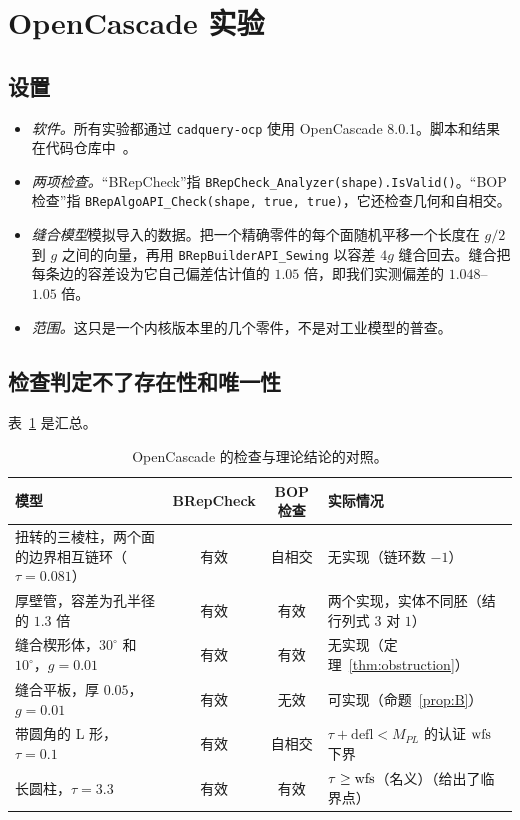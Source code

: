 \section{OpenCascade 实验}\label{sec:experiments}

\subsection{设置}
\begin{itemize}
\item \emph{软件。}所有实验都通过 \texttt{cadquery-ocp} 使用 OpenCascade 8.0.1。脚本和结果在代码仓库中~\cite{repo}。
\item \emph{两项检查。}``BRepCheck''指 \texttt{BRepCheck\_Analyzer(shape).IsValid()}。``BOP 检查''指 \texttt{BRepAlgoAPI\_Check(shape, true, true)}，它还检查几何和自相交。
\item \emph{缝合模型}模拟导入的数据。把一个精确零件的每个面随机平移一个长度在 $g/2$ 到 $g$ 之间的向量，再用 \texttt{BRepBuilderAPI\_Sewing} 以容差 $4g$ 缝合回去。缝合把每条边的容差设为它自己偏差估计值的 $1.05$ 倍，即我们实测偏差的 $1.048$--$1.05$ 倍。
\item \emph{范围。}这只是一个内核版本里的几个零件，不是对工业模型的普查。
\end{itemize}

\subsection{检查判定不了存在性和唯一性}
表~\ref{tab:occ} 是汇总。

\begin{table}[h]
\centering\small
\begin{tabular}{>{\raggedright}p{4.4cm}cc>{\raggedright\arraybackslash}p{5.0cm}}
\toprule
模型 & BRepCheck & BOP 检查 & 实际情况 \\
\midrule
扭转的三棱柱，两个面的边界相互链环（$\tau=0.081$） & 有效 & 自相交 & 无实现（链环数 $-1$） \\
厚壁管，容差为孔半径的 $1.3$ 倍 & 有效 & 有效 & 两个实现，实体不同胚（结行列式 $3$ 对 $1$） \\
缝合楔形体，$30^\circ$ 和 $10^\circ$，$g=0.01$ & 有效 & 有效 & 无实现（定理~\ref{thm:obstruction}） \\
缝合平板，厚 $0.05$，$g=0.01$ & 有效 & 无效 & 可实现（命题~\ref{prop:B}） \\
带圆角的 L 形，$\tau=0.1$ & 有效 & 自相交 & $\tau+\mathrm{defl}<M_{PL}$ 的认证 $\operatorname{wfs}$ 下界 \\
长圆柱，$\tau=3.3$ & 有效 & 有效 & $\tau\ge\operatorname{wfs}$（名义）（给出了临界点） \\
\bottomrule
\end{tabular}
\caption{OpenCascade 的检查与理论结论的对照。}\label{tab:occ}
\end{table}

